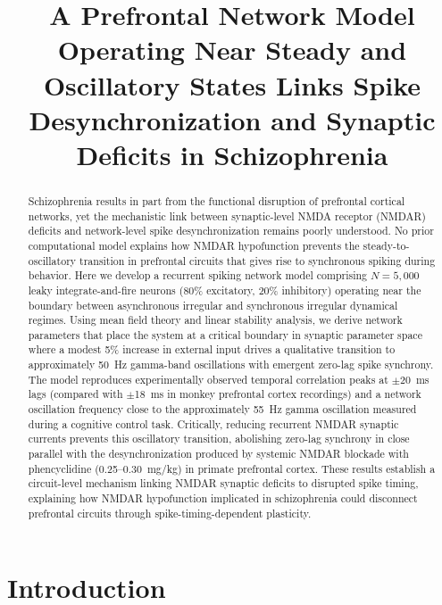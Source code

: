 \documentclass[10pt]{article}
\title{A Prefrontal Network Model Operating Near Steady and Oscillatory States Links Spike Desynchronization and Synaptic Deficits in Schizophrenia}
\date{}
\begin{document}
\maketitle

\begin{abstract}
Schizophrenia results in part from the functional disruption of prefrontal cortical networks, yet the mechanistic link between synaptic-level NMDA receptor (NMDAR) deficits and network-level spike desynchronization remains poorly understood. No prior computational model explains how NMDAR hypofunction prevents the steady-to-oscillatory transition in prefrontal circuits that gives rise to synchronous spiking during behavior. Here we develop a recurrent spiking network model comprising $N = 5{,}000$ leaky integrate-and-fire neurons (80\% excitatory, 20\% inhibitory) operating near the boundary between asynchronous irregular and synchronous irregular dynamical regimes. Using mean field theory and linear stability analysis, we derive network parameters that place the system at a critical boundary in synaptic parameter space where a modest 5\% increase in external input drives a qualitative transition to approximately 50~Hz gamma-band oscillations with emergent zero-lag spike synchrony. The model reproduces experimentally observed temporal correlation peaks at $\pm$20~ms lags (compared with $\pm$18~ms in monkey prefrontal cortex recordings) and a network oscillation frequency close to the approximately 55~Hz gamma oscillation measured during a cognitive control task. Critically, reducing recurrent NMDAR synaptic currents prevents this oscillatory transition, abolishing zero-lag synchrony in close parallel with the desynchronization produced by systemic NMDAR blockade with phencyclidine (0.25--0.30~mg/kg) in primate prefrontal cortex. These results establish a circuit-level mechanism linking NMDAR synaptic deficits to disrupted spike timing, explaining how NMDAR hypofunction implicated in schizophrenia could disconnect prefrontal circuits through spike-timing-dependent plasticity.
\end{abstract}

\section{Introduction}
\end{document}
